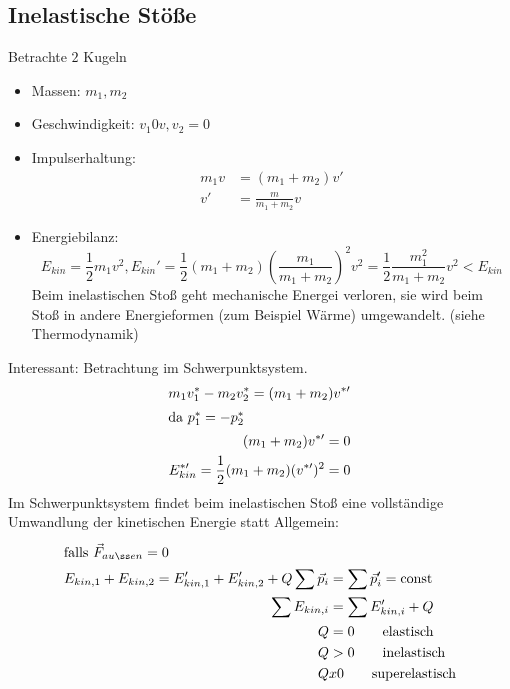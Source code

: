 \documentclass[a4paper]{scrartcl}
\renewcommand{\v}[1]{\vec{#1}}
\theoremstyle{definition}
\theoremstyle{plain}
\theoremstyle{plain}
\theoremstyle{remark}
\theoremstyle{remark}
\theoremstyle{remark}
\begin{document}
\subsection{Inelastische Stöße}
\label{sec-7-3}
Betrachte $2$ Kugeln
\begin{itemize}
\item Massen: $m_1, m_2$
\item Geschwindigkeit: $v_1 0 v, v_2 = 0$
\item Impulserhaltung:
\begin{align*}
m_1 v &= (m_1 +  m_2) v' \\
v' &= \frac{m}{m_1 + m_2} v
\end{align*}
\item Energiebilanz:
\[E_{kin} = \frac{1}{2} m_1 v^2, E_{kin}' = \frac{1}{2} (m_1 + m_2) (\frac{m_1}{m_1 + m_2})^2 v^2 = \frac{1}{2} \frac{m_1^2}{m_1 + m_2}v^2 < E_{kin}\]
Beim inelastischen Stoß geht mechanische Energei verloren, sie wird beim Stoß in andere Energieformen (zum Beispiel Wärme) umgewandelt. (siehe Thermodynamik)
\end{itemize}
Interessant:
Betrachtung im Schwerpunktsystem.
\begin{align*}
m_1 v_1^\ast - m_2 v_2^\ast = (m_1 + m_2) v^{\ast\prime} \\
\intertext{da $p_1^\ast = -p_2^\ast$}
(m_1 + m_2) v^{\ast\prime} = 0 \\
E_{kin}^{\ast\prime} = \frac{1}{2}(m_1 + m_2)(v^{\ast\prime})^2 = 0
\end{align*}
Im Schwerpunktsystem findet beim inelastischen Stoß eine vollständige Umwandlung der kinetischen Energie statt
Allgemein:
\begin{align*}
\intertext{falls $\v F_{außen} =0$}
E_{kin,1} + E_{kin,2} = E_{kin,1}' + E_{kin,2}' + Q
\sum \v p_i &= \sum \v p'_i = \text{const} \\
\sum E_{kin,i} &= \sum E'_{kin,i} + Q \\
Q &= 0 \tag*{elastisch} \\
Q &> 0 \tag*{inelastisch} \\
Q &x 0 \tag*{superelastisch} \\
\end{align*}
\end{document}
